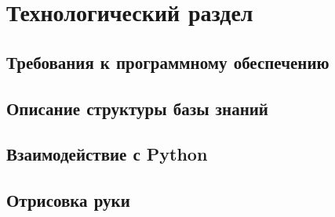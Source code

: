 \chapter{Технологический раздел}


\section{Требования к программному обеспечению}


\section{Описание структуры базы знаний}


\section{Взаимодействие с Python}


\section{Отрисовка руки}

